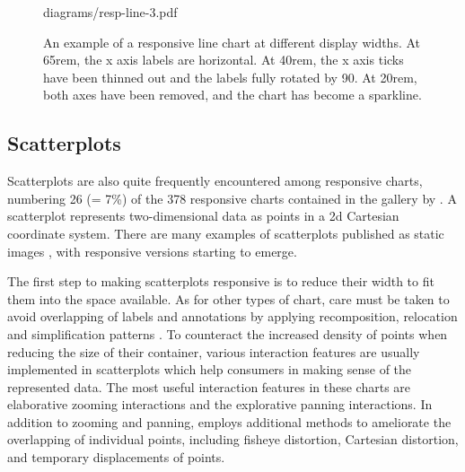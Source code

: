 \begin{figure}[tp]
{{diagrams/resp-line-3.pdf}%
\label{fig:RespLineExample3}%
}
\caption[Responsive Line Chart Example]
{
An example of a responsive line chart at different display widths.
 At 65rem, the x axis labels are
horizontal.   At 40rem, the x axis ticks
have been thinned out and the labels fully rotated by 90\textdegree.
 At 20rem, both axes have been removed,
and the chart has become a sparkline.
}
\label{fig:RespLineExample}
\end{figure}









\subsection{Scatterplots}
\label{sec:ScatterplotExamples}

Scatterplots are also quite frequently encountered among responsive
charts, numbering 26 (= 7\%) of the 378 responsive charts contained in
the gallery by \textcite{DesignPatternsTradeOffsRespVis}. A
scatterplot represents two-dimensional data as points in a 2d
Cartesian coordinate system. There are many examples of scatterplots
published as static images \parencite{Scatter,Scatter2}, with
responsive versions starting to emerge.

The first step to making scatterplots responsive is to reduce their
width to fit them into the space available. As for other types of
chart, care must be taken to avoid overlapping of labels and
annotations by applying recomposition, relocation and simplification
patterns \parencite{RespScatter,RespScatter2}. To counteract the
increased density of points when reducing the size of their container,
various interaction features are usually implemented in scatterplots
which help consumers in making sense of the represented data. The most
useful interaction features in these charts are elaborative zooming
interactions and the explorative panning interactions. In addition to
zooming and panning, \textcite{RespVis} employs additional methods to
ameliorate the overlapping of individual points, including fisheye
distortion, Cartesian distortion, and temporary displacements of
points.

